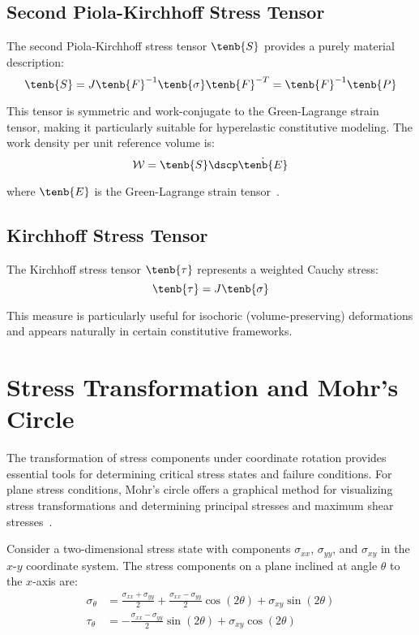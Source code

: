 \subsection{Second Piola-Kirchhoff Stress Tensor}
The second Piola-Kirchhoff stress tensor $\tenb{S}$ provides a purely material description:
\begin{equation}
\tenb{S} = J\tenb{F}^{-1}\tenb{\sigma}\tenb{F}^{-T} = \tenb{F}^{-1}\tenb{P}
\end{equation}

This tensor is symmetric and work-conjugate to the Green-Lagrange strain tensor, making it particularly suitable for hyperelastic constitutive modeling. The work density per unit reference volume is:
\begin{equation}
\mathcal{W} = \tenb{S} \dscp \dot{\tenb{E}}
\end{equation}

where $\tenb{E}$ is the Green-Lagrange strain tensor~\autocite{Sadd.2019}.

\subsection{Kirchhoff Stress Tensor}
The Kirchhoff stress tensor $\tenb{\tau}$ represents a weighted Cauchy stress:
\begin{equation}
\tenb{\tau} = J\tenb{\sigma}
\end{equation}

This measure is particularly useful for isochoric (volume-preserving) deformations and appears naturally in certain constitutive frameworks.

\section{Stress Transformation and Mohr's Circle}

The transformation of stress components under coordinate rotation provides essential tools for determining critical stress states and failure conditions. For plane stress conditions, Mohr's circle offers a graphical method for visualizing stress transformations and determining principal stresses and maximum shear stresses~\autocite{Sadd.2019}.

Consider a two-dimensional stress state with components $\sigma_{xx}$, $\sigma_{yy}$, and $\sigma_{xy}$ in the $x$-$y$ coordinate system. The stress components on a plane inclined at angle $\theta$ to the $x$-axis are:
\begin{align}
\sigma_{\theta} &= \frac{\sigma_{xx} + \sigma_{yy}}{2} + \frac{\sigma_{xx} - \sigma_{yy}}{2}\cos(2\theta) + \sigma_{xy}\sin(2\theta)\\
\tau_{\theta} &= -\frac{\sigma_{xx} - \sigma_{yy}}{2}\sin(2\theta) + \sigma_{xy}\cos(2\theta)
\end{align}

